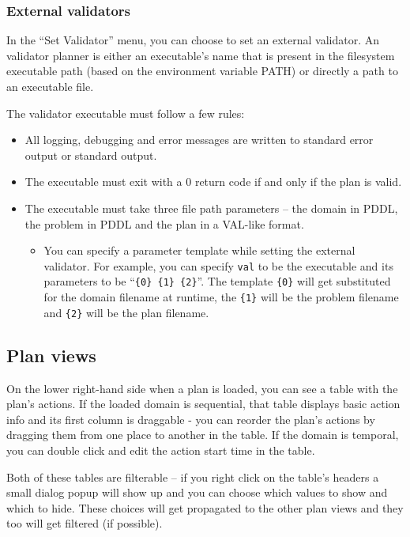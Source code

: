 \subsubsection*{External validators}
In the ``Set Validator'' menu, you can choose to set an external validator. An validator planner is either an
executable's name that is present in the filesystem executable path (based on the environment variable PATH)
or directly a path to an executable file.

The validator executable must follow a few rules:

\begin{itemize}
\item All logging, debugging and error messages are written to standard error output or standard output.

\item The executable must exit with a 0 return code if and only if the plan is valid.

\item The executable must take three file path parameters -- the domain in PDDL, the problem in PDDL and the plan in a
VAL-like format.

\begin{itemize}

\item You can specify a parameter template while setting the external validator.
For example, you can specify \texttt{val} to be the executable and its parameters to be ``\verb+{0} {1} {2}+''.
The template \verb+{0}+ will get substituted for the domain filename at runtime, the \verb+{1}+ will be the problem filename and
\verb+{2}+ will be the plan filename.

\end{itemize}

\end{itemize}

\subsection*{Plan views}
On the lower right-hand side when a plan is loaded, you can see a table with the plan's actions. If the loaded domain
is sequential, that table displays basic action info and its first column is draggable - you can reorder the plan's
actions by dragging them from one place to another in the table. If the domain is temporal, you can double click and
edit the action start time in the table.

Both of these tables are filterable -- if you right click on the table's headers a small dialog popup will show up
and you can choose which values to show and which to hide. These choices will get propagated to the other plan views
and they too will get filtered (if possible).

